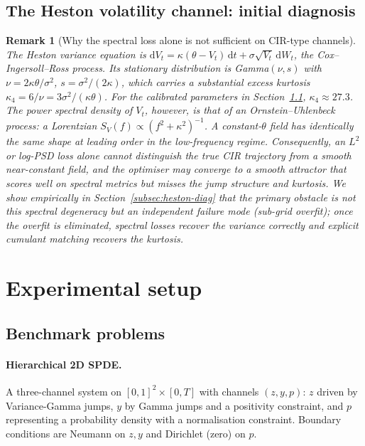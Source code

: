 \documentclass[review,12pt]{elsarticle}
\newtheorem{remark}{Remark}
\begin{document}
\subsection{The Heston volatility channel: initial diagnosis}
\label{subsec:cir-analysis}

\begin{remark}[Why the spectral loss alone is not sufficient on CIR-type channels]
\label{rem:cir}
The Heston variance equation is
\(\mathrm dV_t = \kappa(\theta - V_t)\,\mathrm dt
+ \sigma \sqrt{V_t}\,\mathrm dW_t\), the Cox--Ingersoll--Ross
process. Its stationary distribution is Gamma\((\nu, s)\) with
\(\nu = 2\kappa\theta/\sigma^2\), \(s = \sigma^2/(2\kappa)\),
which carries a substantial excess kurtosis
\(\kappa_4 = 6/\nu = 3\sigma^2/(\kappa\theta)\). For the
calibrated parameters in Section~\ref{subsec:problems},
\(\kappa_4 \approx 27.3\). The power spectral density of
\(V_t\), however, is that of an Ornstein--Uhlenbeck process:
a Lorentzian \(S_V(f) \propto (f^2 + \kappa^2)^{-1}\). A
constant-\(\theta\) field has \emph{identically the same shape}
at leading order in the low-frequency regime. Consequently,
an \(L^2\) or log-PSD loss alone cannot distinguish the true
CIR trajectory from a smooth near-constant field, and the
optimiser may converge to a smooth attractor that scores well
on spectral metrics but misses the jump structure and kurtosis.
We show empirically in Section~\ref{subsec:heston-diag} that
the primary obstacle is not this spectral degeneracy but an
independent failure mode (sub-grid overfit); once the overfit
is eliminated, spectral losses recover the variance correctly
and explicit cumulant matching recovers the kurtosis.
\end{remark}

\section{Experimental setup}
\label{sec:setup}

\subsection{Benchmark problems}
\label{subsec:problems}

\paragraph{Hierarchical 2D SPDE.}
A three-channel system on \([0,1]^2 \times [0, T]\) with channels
\((z, y, p)\): \(z\) driven by Variance-Gamma jumps, \(y\) by
Gamma jumps and a positivity constraint, and \(p\) representing a
probability density with a normalisation constraint. Boundary
conditions are Neumann on \(z, y\) and Dirichlet (zero) on \(p\).
\end{document}
